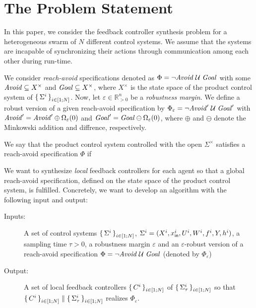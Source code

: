 
\section{The Problem Statement}
\label{sec:problem}
In this paper, we consider the feedback controller synthesis problem for a heterogeneous swarm of $N$ different control systems.
We assume that the systems are incapable of synchronizing their actions through communication among each other during run-time.

We consider \emph{reach-avoid} specifications denoted as $\Phi=\lnot\mathit{Avoid}\;\mathcal{U}\;\mathit{Goal}$ with some $\mathit{Avoid}\subseteq X^\times$ and $\mathit{Goal}\subseteq X^\times$, where $X^\times$ is the state space of the product control system of $\set{\Sigma^i}_{i\in [1;N]}$. Now, let $\varepsilon\in \mathbb{R}^n_{>0}$ be a \emph{robustness margin}. We define a robust version of a given reach-avoid specification by $\Phi_\varepsilon=\lnot\mathit{Avoid}'\;\mathcal{U}\;\mathit{Goal}'$ with $\mathit{Avoid}'=\mathit{Avoid}'\oplus\Omega_\varepsilon(0)$ and $\mathit{Goal}'=\mathit{Goal}\ominus\Omega_\varepsilon(0)$, where $\oplus$ and $\ominus$ denote the Minkowski addition and diffrence, respectively. %

We say that the product control system controlled with the open $\Sigma^\times$ satisfies a reach-avoid specification $\Phi$ if 

We want to synthesize \emph{local} feedback controllers for each agent so that a global reach-avoid specification, defined on the state space of the product control system, is fulfilled.
Concretely, we want to develop an algorithm with the following input and output:
\begin{description}
	\item[Inputs:] A set of control systems $\set{\Sigma^i}_{i\in [1;N]}$, $\Sigma^i=(X^i,x_{\mathsf{in}}^i,U^i,W^i,f^i,Y,h^i)$, a sampling time $\tau >0$, a robustness margin $\varepsilon$ and an $\varepsilon$-robust version of a reach-avoid specification $\Phi=\lnot\mathit{Avoid}\;\mathcal{U}\;\mathit{Goal}$ (denoted by $\Phi_\varepsilon$)%
	\item[Output:] A set of local feedback controllers $\set{C^i}_{i\in [1;N]}$ of $\set{\Sigma^i_\tau}_{i\in [1;N]}$ so that $\set{C^i}_{i\in [1;N]}\parallel \set{\Sigma_\tau^i}_{i\in [1;N]}$ realizes $\Phi_\varepsilon$. 
\end{description}

